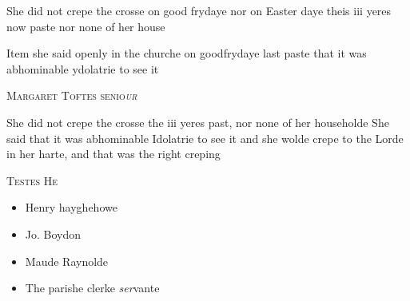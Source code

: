 \documentclass[12pt, a4paper]{book}
\begin{document}
 
 	
				\marginpar[\vspace{0.5cm}{\textcolor{Gray}{ceremonies}}]{}
			
 	
		\ifthenelse{\isodd{\thepage}}
		{\reversemarginpar}
		{\normalmarginpar}
		She did not crepe the crosse on good frydaye
 nor on Easter daye theis iii yeres now paste
 nor none of her house
 
               	
               		
			
               		
		\ifthenelse{\isodd{\thepage}}
		{\reversemarginpar}
		{\normalmarginpar}
		Item she said openly in the churche on goodfrydaye
 last paste that it was abhominable ydolatrie to
 see it
               	
 

               
               	
				\begin{center}  {\scshape Margaret Toftes senio\textit{ur}
                  }  \end{center}
			
               	
			
               	
				\marginpar[\vspace{0.5cm}{\textcolor{Gray}{ceremonies}}]{}
			
 
		\ifthenelse{\isodd{\thepage}}
		{\reversemarginpar}
		{\normalmarginpar}
		She did not crepe the crosse the iii yeres past, nor
  none of her householde
  She said that it was abhominable Idolatrie to see it
 and she wolde crepe to the Lorde in her harte, and
 that was the right creping
 
 	\begin{center} {\scshape Testes He} \end{center}\begin{itemize}
 	
 		\item[]Henry hayghehowe
 		\item[]Jo. Boydon
 		\item[]Maude Raynolde
 		\item[]The parishe clerke \textit{ser}vante
 	\end{itemize}
 


               
\end{document}
